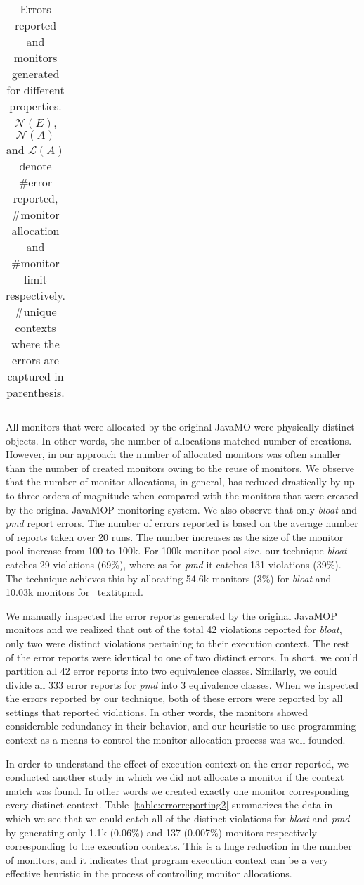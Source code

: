 \begin{table*}[!ht]
\begin{tabular}{|c|c|c||c|c||c|c||c|c|}
\end{tabular}
\caption{Errors reported and monitors generated for different properties.
$\mathcal{N}(E)$, $\mathcal{N}(A)$ and $\mathcal{L}(A)$ denote \#error reported,
\#monitor allocation  and \#monitor limit respectively. \#unique
contexts where the errors are captured in parenthesis.}
\end{table*}
\label{table:errorreporting1}

All monitors that were allocated by the original JavaMO were physically distinct 
objects. In other words, the number of allocations matched number of creations. 
However, in our approach the number of allocated monitors was often smaller than 
the number of created monitors owing to the reuse of monitors. We observe that 
the number of monitor allocations, in general, has reduced drastically by up to 
three orders of magnitude when compared with the monitors that were created by 
the original JavaMOP monitoring system. We also observe that only \textit{bloat} 
and \textit{pmd} report errors. The number of errors reported is based on the 
average number of reports taken over 20 runs. The number increases as the size 
of the monitor pool increase from 100 to 100k. For 100k monitor pool size, our 
technique \textit{bloat} catches 29 violations (69\%), where as for \textit{pmd} 
it catches 131 violations (39\%). The technique achieves this by allocating 
54.6k monitors (3\%) for \textit{bloat} and 10.03k monitors for \
textit{pmd}.

We manually inspected the error reports generated by the original JavaMOP 
monitors and we realized that out of the total 42 violations reported for 
\textit{bloat}, only two were distinct violations pertaining to their execution 
context. The rest of the error reports were identical to one of two distinct 
errors. In short, we could partition all 42 error reports into two equivalence 
classes. Similarly, we could divide all 333 error reports for \textit{pmd} into 
3 equivalence classes. When we inspected the errors reported by our technique, 
both of these errors were reported by all settings that reported violations. In 
other words, the monitors showed considerable redundancy in their behavior, and 
our heuristic to use programming context as a means to control the monitor 
allocation process was well-founded.

In order to understand the effect of execution context on the error reported, we 
conducted another study in which we did not allocate a monitor if the context 
match was found. In other words we created exactly one monitor corresponding 
every distinct context. Table~\ref{table:errorreporting2} summarizes the data in 
which we see that we could catch all of the distinct violations for 
\textit{bloat} and \textit{pmd} by generating only 1.1k (0.06\%) and 137 
(0.007\%) monitors respectively corresponding to the execution contexts. This is 
a huge reduction in the number of monitors, and it indicates that program 
execution context can be a very effective heuristic in the process of 
controlling monitor allocations.

